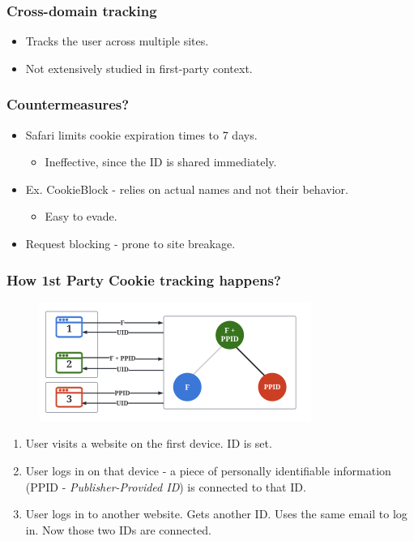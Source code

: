 \documentclass{beamer}
\begin{document}
\begin{frame}
\frametitle{Cross-domain tracking}
\begin{itemize}
\item Tracks the user across multiple sites.
\item Not extensively studied in first-party context.
\end{itemize}
\end{frame}



\begin{frame}
\frametitle{Countermeasures?}

\begin{itemize}
\item Safari limits cookie expiration times to 7 days. 
	\begin{itemize}
	\item Ineffective, since the ID is shared immediately. 
	\end{itemize}
\item Ex. CookieBlock - relies on actual names and not their behavior.
	\begin{itemize}
	\item Easy to evade.
	\end{itemize}
\item Request blocking - prone to site breakage.
\end{itemize}

\end{frame}

\begin{frame}
\frametitle{How 1st Party Cookie tracking happens?}


\begin{figure}
\includegraphics[scale=0.5]{img/crosssite}
\end{figure}

\begin{enumerate}
\item User visits a website on the first device. ID is set.
\item User logs in on that device - a piece of personally identifiable information (PPID - \textit{Publisher-Provided ID}) is connected to that ID.
\item User logs in to another website. Gets another ID. Uses the same email to log in. Now those two IDs are connected.
\end{enumerate}

\end{frame}
\end{document}
